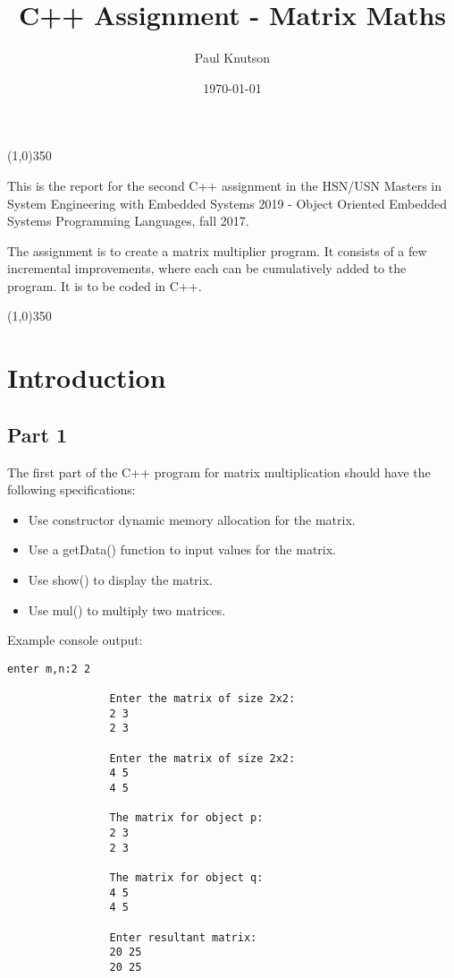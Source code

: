 \documentclass{article}
\begin{document}
	\title{C++ Assignment - Matrix Maths}
	\date{\today}
	\author{Paul Knutson}
	\maketitle
	\thispagestyle{empty}
	
	\begin{center}
		\line(1,0){350}
	
	\hfill \break
	This is the report for the second C++ assignment in the HSN/USN Masters in System Engineering with Embedded Systems 2019 - Object Oriented Embedded Systems Programming Languages, fall 2017.
	
	The assignment is to create a matrix multiplier program. It consists of a few incremental improvements, where each can be cumulatively added to the program. It is to be coded in C++.
	
		\line(1,0){350}
	\end{center}
	
	\clearpage

	\tableofcontents{}
	\clearpage
	
	
	
	\section{Introduction}
		\subsection{Part 1}
			The first part of the C++ program for matrix multiplication should have the following specifications:
			\begin{itemize}
				\item Use constructor dynamic memory allocation for the matrix.
				\item Use a getData() function to input values for the matrix.
				\item Use show() to display the matrix.
				\item Use mul() to multiply two matrices.
			\end{itemize}
		
			Example console output:
			\begin{lstlisting}[style=console]
				enter m,n:2 2
				
				Enter the matrix of size 2x2:
				2 3
				2 3
				
				Enter the matrix of size 2x2:
				4 5
				4 5
				
				The matrix for object p:
				2 3
				2 3
				
				The matrix for object q:
				4 5
				4 5
				
				Enter resultant matrix:
				20 25
				20 25
			\end{lstlisting}
		
\end{document}
